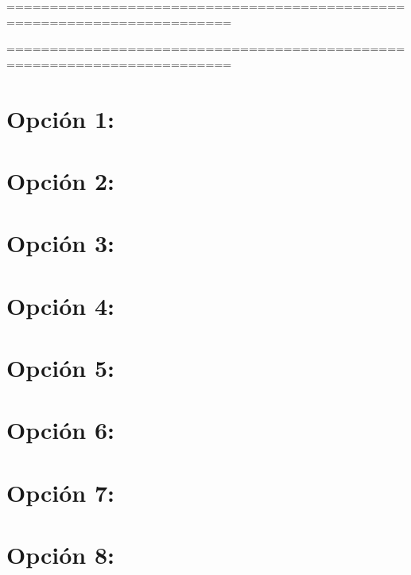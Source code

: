 


\newpage

\noindent
========================================================================


\noindent
========================================================================
\newpage

\section{Opción 1:}

\section{Opción 2:}

\section{Opción 3:}


\section{Opción 4:}


\section{Opción 5:}


\section{Opción 6:}


\section{Opción 7:}


\section{Opción 8:}

